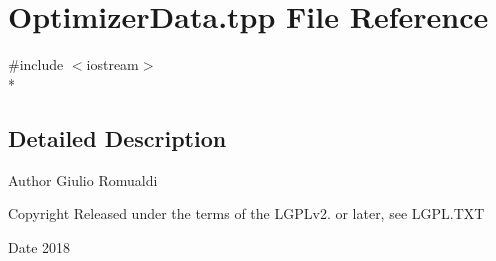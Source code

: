 \section{Optimizer\+Data.\+tpp File Reference}
\label{OptimizerData_8tpp}
{\ttfamily \#include $<$iostream$>$}\\*


\subsection{Detailed Description}
\begin{DoxyAuthor}{Author}
Giulio Romualdi 
\end{DoxyAuthor}
\begin{DoxyCopyright}{Copyright}
Released under the terms of the L\+G\+P\+Lv2. or later, see L\+G\+P\+L.\+T\+XT 
\end{DoxyCopyright}
\begin{DoxyDate}{Date}
2018 
\end{DoxyDate}
